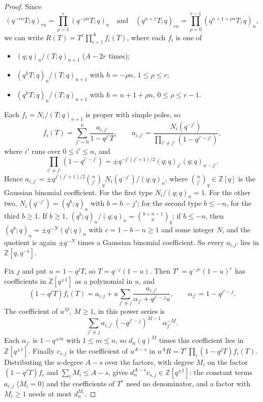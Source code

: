 \documentclass[11pt]{amsart}
\theoremstyle{definition}
\theoremstyle{remark}
\numberwithin{equation}{section}
\newcommand{\ZZ}{\mathbb{Z}}
\begin{document}
\begin{proof}
Since
\[
(q^{-rn}T;q)_{rn}=\prod_{\rho=1}^r(q^{-\rho n}T;q)_n\quad\text{and}\quad
(q^{n+1}T;q)_{rn}=\prod_{\rho=0}^{r-1}(q^{n+1+\rho n}T;q)_n,
\]
we can write $R(T)=T^e\prod_{i=1}^Af_i(T)$, where each $f_i$ is one of
\begin{itemize}
\item $(q;q)_n/(T;q)_{n+1}$ ($A-2r$ times);
\item $(q^hT;q)_n/(T;q)_{n+1}$ with $h=-\rho n$, $1\le\rho\le r$;
\item $(q^hT;q)_n/(T;q)_{n+1}$ with $h=n+1+\rho n$, $0\le\rho\le r-1$.
\end{itemize}
Each $f_i=N_i/(T;q)_{n+1}$ is proper with simple poles, so
\[
f_i(T)=\sum_{j'=0}^n\frac{a_{i,j'}}{1-q^{j'}T},\qquad a_{i,j'}=\frac{N_i(q^{-j'})}{\prod_{i'\ne j'}(1-q^{i'-j'})},
\]
where $i'$ runs over $0\le i'\le n$, and
\[
\prod_{i'\ne j'}(1-q^{i'-j'})=\pm q^{-j'(j'+1)/2}(q;q)_{j'}(q;q)_{n-j'}.
\]
Hence $a_{i,j'}=\pm q^{j'(j'+1)/2}\binom n{j'}_qN_i(q^{-j'})/(q;q)_n$, where $\binom n{j'}_q\in\ZZ[q]$ is the
Gaussian binomial coefficient. For the first type $N_i/(q;q)_n=1$. For the other two, $N_i(q^{-j'})=(q^b;q)_n$ with
$b=h-j'$; for the second type $b\le-n$, for the third $b\ge1$. If $b\ge1$, $(q^b;q)_n/(q;q)_n=\binom{b+n-1}n_q$; if
$b\le-n$, then $(q^b;q)_n=\pm q^{-N}(q^{c};q)_n$ with $c=1-b-n\ge1$ and some integer $N$, and the quotient is again
$\pm q^{-N}$ times a Gaussian binomial coefficient. So every $a_{i,j'}$ lies in $\ZZ[q,q^{-1}]$.

Fix $j$ and put $u=1-q^jT$, so $T=q^{-j}(1-u)$. Then $T^e=q^{-je}(1-u)^e$ has coefficients in $\ZZ[q^{\pm1}]$ as a
polynomial in $u$, and
\[
(1-q^jT)f_i(T)=a_{i,j}+u\sum_{j'\ne j}\frac{a_{i,j'}}{\alpha_{j'}+q^{j'-j}u},\qquad\alpha_{j'}=1-q^{j'-j}.
\]
The coefficient of $u^M$, $M\ge1$, in this power series is
\[
\sum_{j'\ne j}a_{i,j'}\,(-q^{j'-j})^{M-1}\,\alpha_{j'}^{-M}.
\]
Each $\alpha_{j'}$ is $1-q^{\pm m}$ with $1\le m\le n$, so $d_n(q)^M$ times this coefficient lies in $\ZZ[q^{\pm1}]$.
Finally $c_{s,j}$ is the coefficient of $u^{A-s}$ in $u^AR=T^e\prod_i(1-q^jT)f_i(T)$. Distributing the $u$-degree
$A-s$ over the factors, with degree $M_i$ on the factor $(1-q^jT)f_i$ and $\sum_iM_i\le A-s$, gives
$d_n^{A-s}c_{s,j}\in\ZZ[q^{\pm1}]$: the constant terms $a_{i,j}$ ($M_i=0$) and the coefficients of $T^e$ need no
denominator, and a factor with $M_i\ge1$ needs at most $d_n^{M_i}$.
\end{proof}

\end{document}
